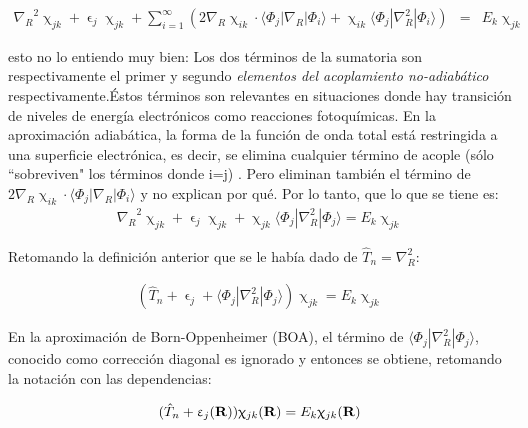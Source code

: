 \documentclass [11pt]{article}
\begin{document}
\begin{eqnarray*}
    {\nabla_R}^2\upchi_{jk}+\upvarepsilon_j \upchi_{jk}+\sum_{i=1}^{\infty}\left(2{\nabla_R}\upchi_{ik}\cdot\langle\Phi_j|\nabla_R|\Phi_i\rangle+\upchi_{ik}\langle\Phi_j|{\nabla_R^2}|\Phi_i\rangle \right) & = & E_k\upchi_{jk}
\end{eqnarray*}

{\color{red} esto no lo entiendo muy bien: Los dos términos de la sumatoria son respectivamente el primer y segundo {\it elementos del acoplamiento no-adiabático} respectivamente.Éstos términos son relevantes en situaciones donde hay transición de niveles de energía electrónicos como reacciones fotoquímicas.}
En la aproximación adiabática, la forma de la función de onda total está restringida a una superficie electrónica, es decir, se elimina cualquier término de acople (sólo ``sobreviven" los términos donde i=j) \cite{jensen}. {\color{red} Pero eliminan también el término de $2{\nabla_R}\upchi_{ik}\cdot\langle\Phi_j|\nabla_R|\Phi_i\rangle$ y no explican por qué}. Por lo tanto, que lo que se tiene es:
\begin{eqnarray*}
    {\nabla_R}^2\upchi_{jk}+\upvarepsilon_j \upchi_{jk}+\upchi_{jk}\langle\Phi_j|{\nabla_R^2}|\Phi_j\rangle =  E_k\upchi_{jk}
\end{eqnarray*}

Retomando la definición anterior que se le había dado de $\hat T_n=\nabla_R^2$:

\begin{eqnarray*}
    (\hat T_n+\upvarepsilon_j+\langle\Phi_j|{\nabla_R^2}|\Phi_j\rangle) \upchi_{jk} =  E_k\upchi_{jk}
\end{eqnarray*}

En la aproximación de Born-Oppenheimer (BOA), el término de $\langle\Phi_j|{\nabla_R^2}|\Phi_j\rangle$, conocido como corrección diagonal es ignorado y entonces se obtiene, retomando la notación con las dependencias:

\begin{equation}\label{BOA}
    (\hat T_n+\upvarepsilon_j({\bf R})) \upchi_{jk}({\bf R}) =  E_k\upchi_{jk}({\bf R})
\end{equation}
\end{document}
